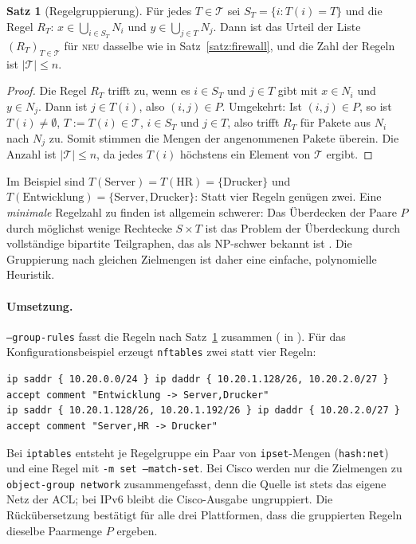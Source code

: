\documentclass[a4paper,12pt, twoside]{report}
\theoremstyle{definition}
\newtheorem{satz}{Satz}
\newcommand{\code}[1]{\texttt{\detokenize{#1}}}
\begin{document}
\begin{satz}[Regelgruppierung]
\label{satz:gruppe}
	Für jedes $T \in \mathcal{T}$ sei $S_T = \{i : T(i) = T\}$ und die Regel $R_T$: $x \in \bigcup_{i\in S_T} N_i$ und $y \in \bigcup_{j\in T} N_j$. Dann ist das Urteil der Liste $(R_T)_{T\in\mathcal{T}}$ für \textsc{neu} dasselbe wie in Satz~\ref{satz:firewall}, und die Zahl der Regeln ist $|\mathcal{T}| \le n$.
\end{satz}

\begin{proof}
	Die Regel $R_T$ trifft zu, wenn es $i\in S_T$ und $j \in T$ gibt mit $x\in N_i$ und $y \in N_j$. Dann ist $j \in T(i)$, also $(i,j) \in P$. Umgekehrt: Ist $(i,j)\in P$, so ist $T(i)\ne\emptyset$, $T := T(i) \in \mathcal{T}$, $i \in S_T$ und $j \in T$, also trifft $R_T$ für Pakete aus $N_i$ nach $N_j$ zu. Somit stimmen die Mengen der angenommenen Pakete überein. Die Anzahl ist $|\mathcal{T}| \le n$, da jedes $T(i)$ höchstens ein Element von $\mathcal{T}$ ergibt.
\end{proof}

Im Beispiel sind $T(\text{Server}) = T(\text{HR}) = \{\text{Drucker}\}$ und $T(\text{Entwicklung}) = \{\text{Server},\text{Drucker}\}$: Statt vier Regeln genügen zwei. Eine \emph{minimale} Regelzahl zu finden ist allgemein schwerer: Das Überdecken der Paare $P$ durch möglichst wenige Rechtecke $S \times T$ ist das Problem der Überdeckung durch vollständige bipartite Teilgraphen, das als NP-schwer bekannt ist \cite{orlin77,gj79}. Die Gruppierung nach gleichen Zielmengen ist daher eine einfache, polynomielle Heuristik.

\paragraph{Umsetzung.} \texttt{--group-rules} fasst die Regeln nach Satz~\ref{satz:gruppe} zusammen (\code{rule_groups} in \code{access.py}). Für das Konfigurationsbeispiel erzeugt \texttt{nftables} zwei statt vier Regeln:
\begin{lstlisting}[language={}, numbers=none, basicstyle=\ttfamily\scriptsize]
ip saddr { 10.20.0.0/24 } ip daddr { 10.20.1.128/26, 10.20.2.0/27 } accept comment "Entwicklung -> Server,Drucker"
ip saddr { 10.20.1.128/26, 10.20.1.192/26 } ip daddr { 10.20.2.0/27 } accept comment "Server,HR -> Drucker"
\end{lstlisting}
Bei \texttt{iptables} entsteht je Regelgruppe ein Paar von \texttt{ipset}-Mengen (\texttt{hash:net}) und eine Regel mit \texttt{-m set --match-set}. Bei Cisco werden nur die Zielmengen zu \texttt{object-group network} zusammengefasst, denn die Quelle ist stets das eigene Netz der ACL; bei IPv6 bleibt die Cisco-Ausgabe ungruppiert. Die Rückübersetzung bestätigt für alle drei Plattformen, dass die gruppierten Regeln dieselbe Paarmenge $P$ ergeben.
\end{document}
